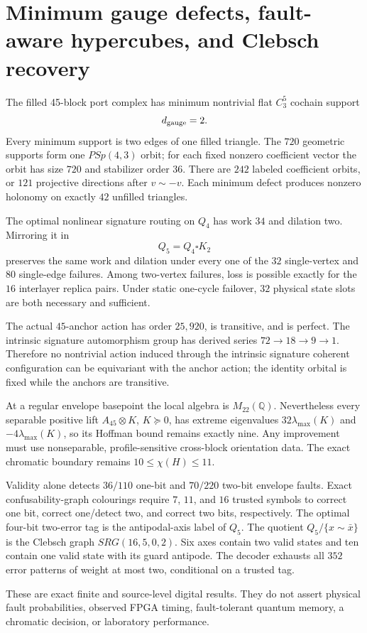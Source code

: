 \section{Minimum gauge defects, fault-aware hypercubes, and Clebsch recovery}
\label{sec:bt3332-3343}

The filled 45-block port complex has minimum nontrivial flat $C_3^5$ cochain support
\[
d_{\rm gauge}=2.
\]
Every minimum support is two edges of one filled triangle.  The $720$ geometric supports form one $PSp(4,3)$ orbit; for each fixed nonzero coefficient vector the orbit has size $720$ and stabilizer order $36$.  There are $242$ labeled coefficient orbits, or $121$ projective directions after $v\sim-v$.  Each minimum defect produces nonzero holonomy on exactly $42$ unfilled triangles.

The optimal nonlinear signature routing on $Q_4$ has work $34$ and dilation two.  Mirroring it in
\[
Q_5=Q_4\square K_2
\]
preserves the same work and dilation under every one of the $32$ single-vertex and $80$ single-edge failures.  Among two-vertex failures, loss is possible exactly for the $16$ interlayer replica pairs.  Under static one-cycle failover, $32$ physical state slots are both necessary and sufficient.

The actual $45$-anchor action has order $25{,}920$, is transitive, and is perfect.  The intrinsic signature automorphism group has derived series $72\to18\to9\to1$.  Therefore no nontrivial action induced through the intrinsic signature coherent configuration can be equivariant with the anchor action; the identity orbital is fixed while the anchors are transitive.

At a regular envelope basepoint the local algebra is $M_{22}(\mathbb Q)$.  Nevertheless every separable positive lift $A_{45}\otimes K$, $K\succeq0$, has extreme eigenvalues $32\lambda_{\max}(K)$ and $-4\lambda_{\max}(K)$, so its Hoffman bound remains exactly nine.  Any improvement must use nonseparable, profile-sensitive cross-block orientation data.  The exact chromatic boundary remains $10\leq\chi(H)\leq11$.

Validity alone detects $36/110$ one-bit and $70/220$ two-bit envelope faults.  Exact confusability-graph colourings require $7$, $11$, and $16$ trusted symbols to correct one bit, correct one/detect two, and correct two bits, respectively.  The optimal four-bit two-error tag is the antipodal-axis label of $Q_5$.  The quotient $Q_5/\{x\sim\bar x\}$ is the Clebsch graph $SRG(16,5,0,2)$.  Six axes contain two valid states and ten contain one valid state with its guard antipode.  The decoder exhausts all $352$ error patterns of weight at most two, conditional on a trusted tag.

These are exact finite and source-level digital results.  They do not assert physical fault probabilities, observed FPGA timing, fault-tolerant quantum memory, a chromatic decision, or laboratory performance.
